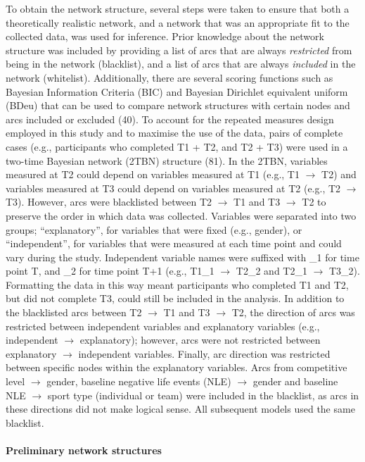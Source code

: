 \documentclass[
  english,
  man]{apa6}
\let\oldparagraph\paragraph
\renewcommand{\paragraph}[1]{\oldparagraph{#1}\mbox{}}
\begin{document}
To obtain the network structure, several steps were taken to ensure that both a theoretically realistic network, and a network that was an appropriate fit to the collected data, was used for inference.
Prior knowledge about the network structure was included by providing a list of arcs that are always \emph{restricted} from being in the network (blacklist), and a list of arcs that are always \emph{included} in the network (whitelist).
Additionally, there are several scoring functions such as Bayesian Information Criteria (BIC) and Bayesian Dirichlet equivalent uniform (BDeu) that can be used to compare network structures with certain nodes and arcs included or excluded (40).
To account for the repeated measures design employed in this study and to maximise the use of the data, pairs of complete cases (e.g., participants who completed T1 + T2, and T2 + T3) were used in a two-time Bayesian network (2TBN) structure (81).
In the 2TBN, variables measured at T2 could depend on variables measured at T1 (e.g., T1 \(\rightarrow\) T2) and variables measured at T3 could depend on variables measured at T2 (e.g., T2 \(\rightarrow\) T3).
However, arcs were blacklisted between T2 \(\rightarrow\) T1 and T3 \(\rightarrow\) T2 to preserve the order in which data was collected.
Variables were separated into two groups; ``explanatory'', for variables that were fixed (e.g., gender), or ``independent'', for variables that were measured at each time point and could vary during the study.
Independent variable names were suffixed with \_1 for time point T, and \_2 for time point T+1 (e.g., T1\_1 \(\rightarrow\) T2\_2 and T2\_1 \(\rightarrow\) T3\_2).
Formatting the data in this way meant participants who completed T1 and T2, but did not complete T3, could still be included in the analysis.
In addition to the blacklisted arcs between T2 \(\rightarrow\) T1 and T3 \(\rightarrow\) T2, the direction of arcs was restricted between independent variables and explanatory variables (e.g., independent \(\rightarrow\) explanatory); however, arcs were not restricted between explanatory \(\rightarrow\) independent variables.
Finally, arc direction was restricted between specific nodes within the explanatory variables.
Arcs from competitive level \(\rightarrow\) gender, baseline negative life events (NLE) \(\rightarrow\) gender and baseline NLE \(\rightarrow\) sport type (individual or team) were included in the blacklist, as arcs in these directions did not make logical sense.
All subsequent models used the same blacklist.

\hypertarget{preliminary-network-structures}{%
\paragraph{Preliminary network structures}\label{preliminary-network-structures}}
\end{document}
